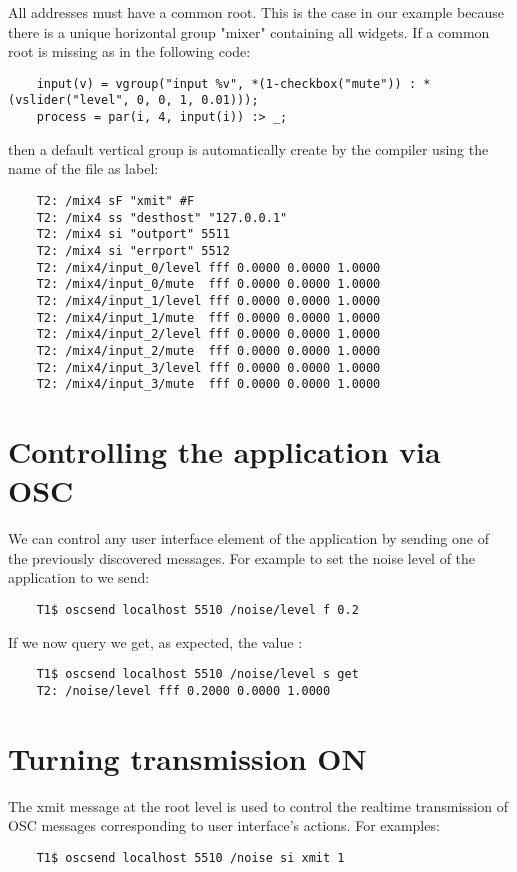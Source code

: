All addresses must have a common root. This is the case in our example because there is a unique horizontal group "mixer" containing all widgets. If a common root is missing as in the following code:
\begin{lstlisting}
	input(v) = vgroup("input %v", *(1-checkbox("mute")) : *(vslider("level", 0, 0, 1, 0.01)));
	process = par(i, 4, input(i)) :> _;
\end{lstlisting}
then a default vertical group is automatically create by the \faust compiler using the name of the file  as label:
\begin{lstlisting}
	T2: /mix4 sF "xmit" #F
	T2: /mix4 ss "desthost" "127.0.0.1"
	T2: /mix4 si "outport" 5511
	T2: /mix4 si "errport" 5512
	T2: /mix4/input_0/level fff 0.0000 0.0000 1.0000
	T2: /mix4/input_0/mute  fff 0.0000 0.0000 1.0000
	T2: /mix4/input_1/level fff 0.0000 0.0000 1.0000
	T2: /mix4/input_1/mute  fff 0.0000 0.0000 1.0000
	T2: /mix4/input_2/level fff 0.0000 0.0000 1.0000
	T2: /mix4/input_2/mute  fff 0.0000 0.0000 1.0000
	T2: /mix4/input_3/level fff 0.0000 0.0000 1.0000
	T2: /mix4/input_3/mute  fff 0.0000 0.0000 1.0000
\end{lstlisting}

\section{Controlling the application via OSC}

We can control any user interface element of the application by sending one of the previously discovered messages. For example to set the noise level of the application to  we send:
\begin{lstlisting}
	T1$ oscsend localhost 5510 /noise/level f 0.2
\end{lstlisting}
	
If we now query  we get, as expected, the value :
\begin{lstlisting}
	T1$ oscsend localhost 5510 /noise/level s get
	T2: /noise/level fff 0.2000 0.0000 1.0000
\end{lstlisting}


\section{Turning transmission ON}
The xmit message at the root level is used to control the realtime transmission of OSC messages corresponding to user interface's actions. For examples:
\begin{lstlisting}
	T1$ oscsend localhost 5510 /noise si xmit 1
\end{lstlisting}

